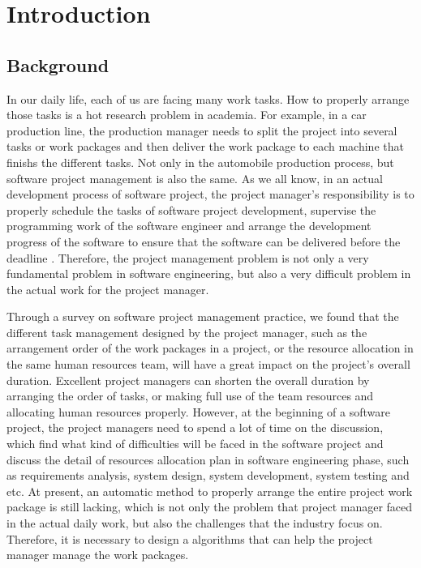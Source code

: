 
\section{Introduction}

\subsection{Background}
%
In our daily life, each of us are facing many work tasks.  How to properly
arrange those tasks is a hot research problem in academia. For example, in a car
production line, the production manager needs to split the project into several
tasks or work packages and then deliver the work package to each machine that
finishs the different tasks. Not only in the automobile production process, but
software project management is also the same. As we all know, in an actual
development process of software project, the project manager's responsibility is
to properly schedule the tasks of software project development, supervise the
programming work of the software engineer and arrange the development progress
of the software to ensure that the software can be delivered before the deadline
\cite{stellman}. Therefore, the project management problem is not only a very
fundamental problem in software engineering, but also a very difficult problem
in the actual work for the project manager.


Through a survey on software project management practice, we found that the
different task management designed by the project manager, such as the
arrangement order of the work packages in a project, or the resource allocation
in the same human resources team, will have a great impact on the project's
overall duration. Excellent project managers can shorten the overall duration by
arranging the order of tasks, or making full use of the team resources and
allocating human resources properly. However, at the beginning of a software
project, the project managers need to spend a lot of time on the discussion,
which find what kind of difficulties will be faced in the software project and
discuss the detail of resources allocation plan in software engineering phase,
such as requirements analysis, system design, system development, system testing
and etc. At present, an automatic method to properly arrange the entire project
work package is still lacking, which is not only the problem that project
manager faced in the actual daily work, but also the challenges that the
industry focus on. Therefore, it is necessary to design a algorithms that can
help the project manager manage the work packages.


